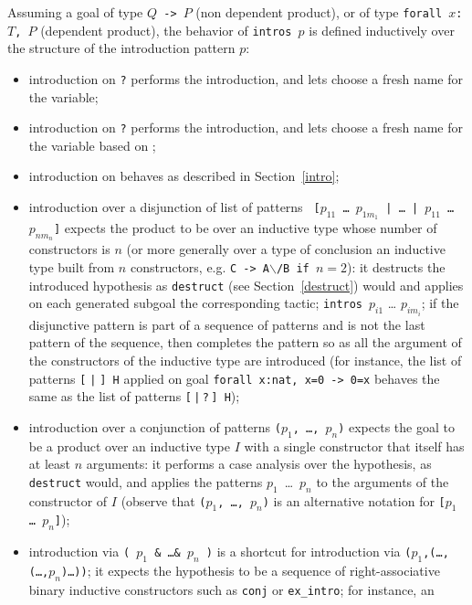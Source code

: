 Assuming a goal of type {\tt $Q$ -> $P$} (non dependent product), or
of type {\tt forall $x$:$T$, $P$} (dependent product), the behavior of
{\tt intros $p$} is defined inductively over the structure of the
introduction pattern $p$:
\begin{itemize}
\item introduction on \texttt{?} performs the introduction, and lets {\Coq}
  choose a fresh name for the variable;
\item introduction on \texttt{?\ident} performs the introduction, and
  lets {\Coq} choose a fresh name for the variable based on {\ident};
\item introduction on \texttt{\ident} behaves as described in
  Section~\ref{intro};
\item introduction over a disjunction of list of patterns {\tt
  [$p_{11}$ {\ldots} $p_{1m_1}$ | {\ldots} | $p_{11}$ {\ldots}
    $p_{nm_n}$]} expects the product to be over an inductive type
  whose number of constructors is $n$ (or more generally over a type
  of conclusion an inductive type built from $n$ constructors,
  e.g. {\tt C -> A$\backslash$/B if $n=2$}): it destructs the introduced
  hypothesis as {\tt destruct} (see Section~\ref{destruct}) would and
  applies on each generated subgoal the corresponding tactic;
  \texttt{intros}~$p_{i1}$ {\ldots} $p_{im_i}$; if the disjunctive
  pattern is part of a sequence of patterns and is not the last
  pattern of the sequence, then {\Coq} completes the pattern so as all
  the argument of the constructors of the inductive type are
  introduced (for instance, the list of patterns {\tt [$\;$|$\;$] H}
  applied on goal {\tt forall x:nat, x=0 -> 0=x} behaves the same as
  the list of patterns {\tt [$\,$|$\,$?$\,$] H});
\item introduction over a conjunction of patterns {\tt ($p_1$, \ldots,
  $p_n$)} expects the goal to be a product over an inductive type $I$ with a
  single constructor that itself has at least $n$ arguments: it
  performs a case analysis over the hypothesis, as {\tt destruct}
  would, and applies the patterns $p_1$~\ldots~$p_n$ to the arguments
  of the constructor of $I$ (observe that {\tt ($p_1$, {\ldots},
  $p_n$)} is an alternative notation for {\tt [$p_1$ {\ldots}
  $p_n$]});
\item introduction via {\tt ( $p_1$ \& \ldots \& $p_n$ )}
  is a shortcut for introduction via
  {\tt ($p_1$,(\ldots,(\dots,$p_n$)\ldots))}; it expects the
  hypothesis to be a sequence of right-associative binary inductive 
  constructors such as {\tt conj} or {\tt ex\_intro}; for instance, an

\end{itemize}

